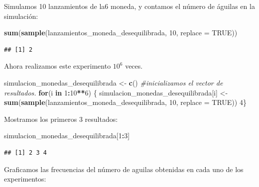 \documentclass[11pt,]{article}
\newenvironment{Shaded}{\begin{snugshade}}{\end{snugshade}}
\newcommand{\CommentTok}[1]{\textcolor[rgb]{0.56,0.35,0.01}{\textit{#1}}}
\newcommand{\ControlFlowTok}[1]{\textcolor[rgb]{0.13,0.29,0.53}{\textbf{#1}}}
\newcommand{\DataTypeTok}[1]{\textcolor[rgb]{0.13,0.29,0.53}{#1}}
\newcommand{\DecValTok}[1]{\textcolor[rgb]{0.00,0.00,0.81}{#1}}
\newcommand{\KeywordTok}[1]{\textcolor[rgb]{0.13,0.29,0.53}{\textbf{#1}}}
\newcommand{\NormalTok}[1]{#1}
\newcommand{\OperatorTok}[1]{\textcolor[rgb]{0.81,0.36,0.00}{\textbf{#1}}}
\newcommand{\OtherTok}[1]{\textcolor[rgb]{0.56,0.35,0.01}{#1}}
\newcommand{\StringTok}[1]{\textcolor[rgb]{0.31,0.60,0.02}{#1}}
\begin{document}
Simulamos 10 lanzamientos de la6 moneda, y contamos el número de águilas
en la simulación:

\begin{Shaded}
\begin{Highlighting}[]
\KeywordTok{sum}\NormalTok{(}\KeywordTok{sample}\NormalTok{(lanzamientos_moneda_desequilibrada, }\DecValTok{10}\NormalTok{, }\DataTypeTok{replace =} \OtherTok{TRUE}\NormalTok{))}
\end{Highlighting}
\end{Shaded}

\begin{verbatim}
## [1] 2
\end{verbatim}

Ahora realizamos este experimento \(10^6\) veces.

\begin{Shaded}
\begin{Highlighting}[]
\NormalTok{simulacion_monedas_desequilibrada <-}\StringTok{ }\KeywordTok{c}\NormalTok{() }\CommentTok{#inicializamos el vector de resultados. }
\ControlFlowTok{for}\NormalTok{(i }\ControlFlowTok{in} \DecValTok{1}\OperatorTok{:}\DecValTok{10}\OperatorTok{**}\DecValTok{6}\NormalTok{) \{}
\NormalTok{simulacion_monedas_desequilibrada[i] <-}\KeywordTok{sum}\NormalTok{(}\KeywordTok{sample}\NormalTok{(lanzamientos_moneda_desequilibrada, }\DecValTok{10}\NormalTok{, }\DataTypeTok{replace =} \OtherTok{TRUE}\NormalTok{))}
\DecValTok{4}\NormalTok{\}}
\end{Highlighting}
\end{Shaded}

Mostramos los primeros 3 resultados:

\begin{Shaded}
\begin{Highlighting}[]
\NormalTok{simulacion_monedas_desequilibrada[}\DecValTok{1}\OperatorTok{:}\DecValTok{3}\NormalTok{]}
\end{Highlighting}
\end{Shaded}

\begin{verbatim}
## [1] 2 3 4
\end{verbatim}

Graficamos las frecuencias del número de aguilas obtenidas en cada uno
de los experimentos:
\end{document}
